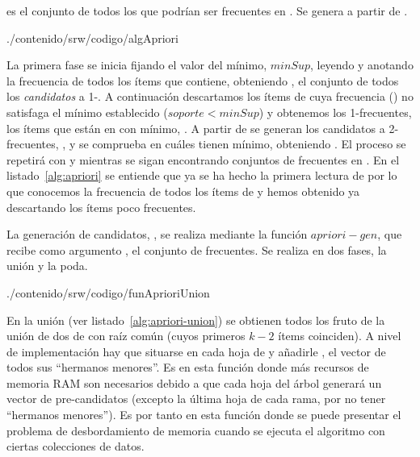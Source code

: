 \begin{Definition}
   \aprioriC es el conjunto de todos los \kitemsets que podrían ser frecuentes en \D. Se genera a partir de \aprioriL[k-1].
\label{def:1-3-2-cjto-candidatos}
\end{Definition}



                 {./contenido/srw/codigo/algApriori}
                 
La primera fase se inicia fijando el valor del \soporte mínimo, $minSup$, leyendo \D y anotando la frecuencia de todos los ítems que contiene, obteniendo \aprioriC[1], el conjunto de todos los \emph{candidatos} a 1-\itemset. A continuación descartamos los ítems de \aprioriC[1] cuya frecuencia (\soporte) no satisfaga el \soporte mínimo establecido ($soporte < minSup$) y obtenemos los 1-\itemsets frecuentes, los ítems que están en \D con \soporte mínimo, \aprioriL[1]. A partir de \aprioriL[1] se generan los candidatos a 2-\itemsets frecuentes, \aprioriC[2], y se comprueba en \D cuáles tienen \soporte mínimo, obteniendo \aprioriC[2]. El proceso se repetirá con \aprioriC y \aprioriL[k] mientras se sigan encontrando conjuntos de \kitemsets frecuentes en \D. En el listado~\ref{alg:apriori} se entiende que ya se ha hecho la primera lectura de \D por lo que conocemos la frecuencia de todos los ítems de \D y hemos obtenido ya \aprioriL[1] descartando los ítems poco frecuentes.

La generación de candidatos, \aprioriC, se realiza mediante la función $apriori-gen$, que recibe como argumento \aprioriL[k-1], el conjunto de \kitemsets[(k-1)] frecuentes. Se realiza en dos fases, la unión y la poda.


                 {./contenido/srw/codigo/funAprioriUnion}

En la unión (ver listado~\ref{alg:apriori-union}) se obtienen todos los \kitemsets fruto de la unión de dos \itemsets de \aprioriL[k-1] con raíz común (cuyos primeros $k-2$ ítems coinciden). A nivel de implementación hay que situarse en cada hoja de \aprioriL[k-1] y añadirle \aprioriC, el vector de todos sus "`hermanos menores"'. Es en esta función donde más recursos de memoria RAM son necesarios debido a que cada hoja del árbol \aprioriL generará un vector de pre-candidatos (excepto la última hoja de cada rama, por no tener "`hermanos menores"'). Es por tanto en esta función donde se puede presentar el problema de desbordamiento de memoria cuando se ejecuta el algoritmo con ciertas colecciones de datos.


